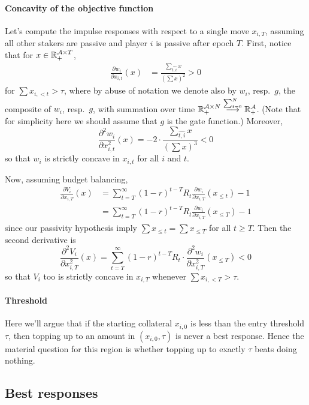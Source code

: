 \paragraph{Concavity of the objective function}
Let's compute the impulse responses with respect to a single move $x_{i,T}$, assuming all other stakers are passive and player $i$ is passive after epoch $T$.
%
First, notice that for $x\in\mathbb{R}_+^{\mathcal{A}\times T}$,
\begin{align*}
  \frac{\partial w_i}{\partial x_{i,t}}(x) &= \frac{\sum_{\widehat{t,i}} x}{(\sum x)^2} > 0
\end{align*}
for $\sum x_{i,<t}>\tau$, where by abuse of notation we denote also by $w_i$, resp.~$g$, the composite of $w_i$, resp.~$g$, with summation over time $\mathbb{R}_+^{\mathcal{A}\times N}\stackrel{\sum_{t=0}^N}{\longrightarrow}\mathbb{R}_+^{\mathcal{A}}$.
%
(Note that for simplicity here we should assume that $g$ is the gate function.)
%
Moreover, 
\[
  \frac{\partial^2 w_i}{\partial x_{i,t}^2}(x) = -2\cdot\frac{\sum_{\widehat{t,i}} x}{(\sum x)^3} < 0
\]
so that $w_i$ is strictly concave in $x_{i,t}$ for all $i$ and $t$.

Now, assuming budget balancing,
%
\begin{align*}
  \frac{\partial V_i}{\partial x_{i,T}}(x) &= \sum_{t=T}^\infty (1-r)^{t-T} R_t\frac{\partial w_i}{\partial x_{i,T}}(x_{\leq t}) - 1\\
  &= \sum_{t=T}^\infty (1-r)^{t-T} R_t\frac{\partial w_i}{\partial x_{i,T}}(x_{\leq T})  - 1
\end{align*}
since our passivity hypothesis imply $\sum x_{\leq t}=\sum x_{\leq T}$ for all $t\geq T$.
%
Then the second derivative is
\[
  \frac{\partial^2 V_i}{\partial x_{i,T}^2}(x) = \sum_{t=T}^\infty (1-r)^{t-T} R_t \cdot\frac{\partial^2 w_i}{\partial x_{i,T}^2}(x_{\leq T}) < 0
\]
so that $V_i$ too is strictly concave in $x_{i,T}$ whenever $\sum x_{i,<T}>\tau$.

\paragraph{Threshold}
Here we'll argue that if the starting collateral $x_{i,0}$ is less than the entry threshold $\tau$, then topping up to an amount in $(x_{i,0},\tau)$ is never a best response.
%
Hence the material question for this region is whether topping up to exactly $\tau$ beats doing nothing.


\subsection{Best responses}

